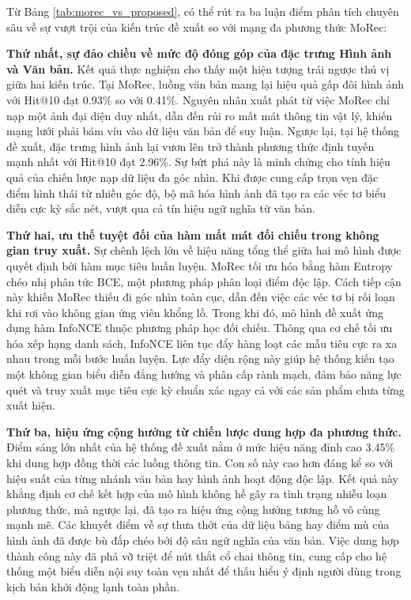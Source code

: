 Từ Bảng \ref{tab:morec_vs_proposed}, có thể rút ra ba luận điểm phân tích chuyên sâu về sự vượt trội của kiến trúc đề xuất so với mạng đa phương thức MoRec:

\textbf{Thứ nhất, sự đảo chiều về mức độ đóng góp của đặc trưng Hình ảnh và Văn bản.}
Kết quả thực nghiệm cho thấy một hiện tượng trái ngược thú vị giữa hai kiến trúc. Tại MoRec, luồng văn bản mang lại hiệu quả gấp đôi hình ảnh với Hit@10 đạt 0.93\% so với 0.41\%. Nguyên nhân xuất phát từ việc MoRec chỉ nạp một ảnh đại diện duy nhất, dẫn đến rủi ro mất mát thông tin vật lý, khiến mạng lưới phải bám víu vào dữ liệu văn bản để suy luận. Ngược lại, tại hệ thống đề xuất, đặc trưng hình ảnh lại vươn lên trở thành phương thức định tuyến mạnh nhất với Hit@10 đạt 2.96\%. Sự bứt phá này là minh chứng cho tính hiệu quả của chiến lược nạp dữ liệu đa góc nhìn. Khi được cung cấp trọn vẹn đặc điểm hình thái từ nhiều góc độ, bộ mã hóa hình ảnh đã tạo ra các véc tơ biểu diễn cực kỳ sắc nét, vượt qua cả tín hiệu ngữ nghĩa từ văn bản.

\textbf{Thứ hai, ưu thế tuyệt đối của hàm mất mát đối chiếu trong không gian truy xuất.}
Sự chênh lệch lớn về hiệu năng tổng thể giữa hai mô hình được quyết định bởi hàm mục tiêu huấn luyện. MoRec tối ưu hóa bằng hàm Entropy chéo nhị phân tức BCE, một phương pháp phân loại điểm độc lập. Cách tiếp cận này khiến MoRec thiếu đi góc nhìn toàn cục, dẫn đến việc các véc tơ bị rối loạn khi rơi vào không gian ứng viên khổng lồ. Trong khi đó, mô hình đề xuất ứng dụng hàm InfoNCE thuộc phương pháp học đối chiếu. Thông qua cơ chế tối ưu hóa xếp hạng danh sách, InfoNCE liên tục đẩy hàng loạt các mẫu tiêu cực ra xa nhau trong mỗi bước huấn luyện. Lực đẩy diện rộng này giúp hệ thống kiến tạo một không gian biểu diễn đẳng hướng và phân cấp rành mạch, đảm bảo năng lực quét và truy xuất mục tiêu cực kỳ chuẩn xác ngay cả với các sản phẩm chưa từng xuất hiện.

\textbf{Thứ ba, hiệu ứng cộng hưởng từ chiến lược dung hợp đa phương thức.}
Điểm sáng lớn nhất của hệ thống đề xuất nằm ở mức hiệu năng đỉnh cao 3.45\% khi dung hợp đồng thời các luồng thông tin. Con số này cao hơn đáng kể so với hiệu suất của từng nhánh văn bản hay hình ảnh hoạt động độc lập. Kết quả này khẳng định cơ chế kết hợp của mô hình không hề gây ra tình trạng nhiễu loạn phương thức, mà ngược lại, đã tạo ra hiệu ứng cộng hưởng tương hỗ vô cùng mạnh mẽ. Các khuyết điểm về sự thưa thớt của dữ liệu bảng hay điểm mù của hình ảnh đã được bù đắp chéo bởi độ sâu ngữ nghĩa của văn bản. Việc dung hợp thành công này đã phá vỡ triệt để nút thắt cổ chai thông tin, cung cấp cho hệ thống một biểu diễn nội suy toàn vẹn nhất để thấu hiểu ý định người dùng trong kịch bản khởi động lạnh toàn phần.

